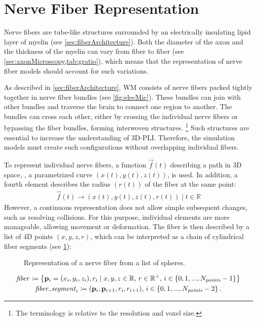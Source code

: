 \section{Nerve Fiber Representation}
\label{sec:nerve_fiber_representation}
%
Nerve fibers are tube-like structures surrounded by an electrically insulating lipid layer of myelin (see \cref{sec:fiberArchitecture}).
Both the diameter of the axon and the thickness of the myelin can vary from fiber to fiber (see \cref{sec:axonMicroscopy,tab:gratio}), which
means that the representation of nerve fiber models should account for such variations.
\par
%
As described in \cref{sec:fiberArchitecture}, \ac{WM} consists of nerve fibers packed tightly together in nerve fiber bundles (see \cref{fig:elecMic}).
These bundles can join with other bundles and traverse the brain to connect one region to another.
The bundles can cross each other, either by crossing the individual nerve fibers or bypassing the fiber bundles, forming interwoven structures.
\footnote{The terminology  is relative to the resolution and voxel size.}
Such structures are essential to increase the understanding of \ac{3D-PLI}.
Therefore, the simulation models must create such configurations without overlapping individual fibers.
\par
%
To represent individual nerve fibers, a function $\vec{f}(t)$ describing a path in 3D space, \ie{}, a parametrized curve $(x(t), y(t), z(t))$, is used.
In addition, a fourth element describes the radius $(r(t))$ of the fiber at the same point:
%
\begin{align}
\vec{f}(t) \rightarrow (x(t), y(t), z(t), r(t)) \; | \; t \in \mathbb{R}
\end{align}
%
However, a continuous representation does not allow simple subsequent changes, such as resolving collisions.
For this purpose, individual elements are more manageable, allowing movement or deformation.
The fiber is then described by a list of 4D points $(x,y,z,r)$, which can be interpreted as a chain of cylindrical fiber segments (see \cref{fig:fiberReb}):
%
\begin{figure}[!t]
    \setlength{\tikzwidth}{0.85\textwidth}
    \centering
	\caption[]{Representation of a nerve fiber from a list of spheres.}
	\label{fig:fiberReb}
\end{figure}
%
\begin{align}
\begin{gathered}
\mathit{fiber} \coloneqq \left\{ \vec{p}_i=(x_i,y_i,z_i), r_i \mid x,y,z \in \mathbb{R}, \, r \in \mathbb{R^+}, \, i \in \{0,1,...,N_{\mathit{points}}-1\}\right\} \\
\mathit{fiber\tum{}segment}_i \coloneqq (\vec{p}_i, \vec{p}_{i+1}, r_i, r_{i+1}), \, i \in \{0,1,...,N_{\mathit{points}}-2\} \, .
\end{gathered}
\end{align}
